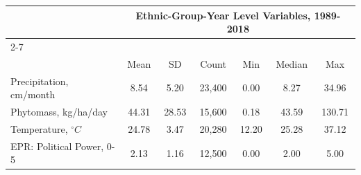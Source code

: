 {
\def\sym#1{\ifmmode^{#1}\else\(^{#1}\)\fi}
\begin{tabular}{l*{1}{cccccc}}
\toprule
     &\multicolumn{6}{c}{Ethnic-Group-Year Level Variables, 1989-2018}             \\\cmidrule(lr){2-7}
     &\multicolumn{6}{c}{}                                                         \\
     &        Mean&          SD&       Count&         Min&      Median&         Max\\
\midrule
Precipitation, cm/month&        8.54&        5.20&      23,400&        0.00&        8.27&       34.96\\
Phytomass, kg/ha/day&       44.31&       28.53&      15,600&        0.18&       43.59&      130.71\\
Temperature, $^{\circ}C$&       24.78&        3.47&      20,280&       12.20&       25.28&       37.12\\
EPR: Political Power, 0-5&        2.13&        1.16&      12,500&        0.00&        2.00&        5.00\\
\bottomrule
\end{tabular}
}
